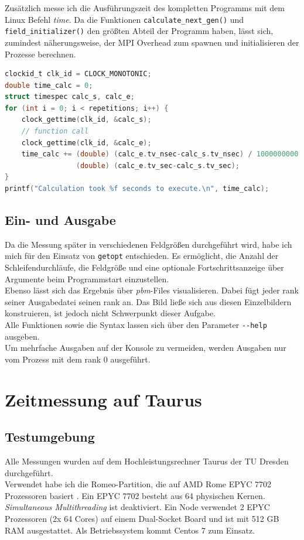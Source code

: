 \documentclass[german,plainarticle,hyperref,utf8]{zihpub}
\begin{document}
	Zusätzlich messe ich die Ausführungszeit des kompletten Programms mit dem Linux Befehl \textit{time}. Da die Funktionen \texttt{calculate\_next\_gen()} und \texttt{field\_initializer()} den größten Abteil der Programm haben, lässt sich, zumindest näherungsweise, der MPI Overhead zum spawnen und initialisieren der Prozesse berechnen.
	\begin{lstlisting}[language=C, caption=Berechnung der Ausführungszeit eines \textit{function calls}]
clockid_t clk_id = CLOCK_MONOTONIC;
double time_calc = 0;
struct timespec calc_s, calc_e;
for (int i = 0; i < repetitions; i++) {
	clock_gettime(clk_id, &calc_s);
	// function call
	clock_gettime(clk_id, &calc_e);
	time_calc += (double) (calc_e.tv_nsec-calc_s.tv_nsec) / 1000000000 +
	             (double) (calc_e.tv_sec-calc_s.tv_sec);
}
printf("Calculation took %f seconds to execute.\n", time_calc);
\end{lstlisting}
	
	\subsection{Ein- und Ausgabe}
	Da die Messung später in verschiedenen Feldgrößen durchgeführt wird, habe ich mich für den Einsatz von \verb|getopt| entschieden. Es ermöglicht, die Anzahl der Schleifendurchläufe, die Feldgröße und eine optionale Fortschrittsanzeige über Argumente beim Programmstart einzustellen.\\
	Ebenso lässt sich das Ergebnis über \textit{pbm}-Files visualisieren. Dabei fügt jeder rank seiner Ausgabedatei seinen rank an. Das Bild ließe sich aus diesen Einzelbildern konstruieren, ist jedoch nicht Schwerpunkt dieser Aufgabe.\\
	Alle Funktionen sowie die Syntax lassen sich über den Parameter \texttt{-{}-help} ausgeben.\\
	
	Um mehrfache Ausgaben auf der Konsole zu vermeiden, werden Ausgaben nur vom Prozess mit dem rank 0 ausgeführt.
	\newpage
	\section{Zeitmessung auf Taurus}
	\subsection{Testumgebung} \label{umgebung}
	Alle Messungen wurden auf dem Hochleistungsrechner Taurus der TU Dresden durchgeführt.\\
	Verwendet habe ich die Romeo-Partition, die auf AMD Rome EPYC 7702 Prozessoren basiert \cite{hpc}. Ein EPYC 7702 besteht aus 64 physischen Kernen. \textit{Simultaneous Multithreading} ist deaktiviert. Ein Node verwendet 2 EPYC Prozessoren (2x 64 Cores) auf einem Dual-Socket Board und ist mit 512 GB RAM ausgestattet. Als Betriebssystem kommt Centos 7 zum Einsatz.\\
	
\end{document}
